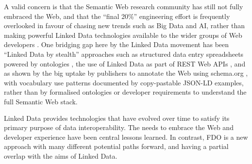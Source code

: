 A valid concern is that the Semantic Web research community has still not fully embraced the Web, and that the ``final 20\%'' engineering effort is frequently overlooked in favour of chasing new trends such as Big Data and AI, rather than making powerful Linked Data technologies available to the wider groups of Web developers \cite{verborghSemanticWebIdentity2020a}. One bridging gap here by the Linked Data movement has been ``Linked Data by stealth'' approaches such as structured data entry spreadsheets powered by ontologies \cite{wolstencroftRightFieldEmbeddingOntology2011b}, the use of Linked Data as part of REST Web APIs \cite{pageRESTLinkedData2011}, and as shown by the big uptake by publishers to annotate the Web using schema.org \cite{bernsteinNewLookSemantic2016a}, with vocabulary use patterns documented by copy-pastable JSON-LD examples, rather than by formalised ontologies or developer requirements to understand the full Semantic Web stack.

Linked Data provides technologies that have evolved over time to satisfy its primary purpose of data interoperability. The needs to embrace the Web and developer experience have been central lessons learned.  In contrast, FDO is a new approach with many different potential paths forward, and having a partial overlap with the aims of Linked Data.



